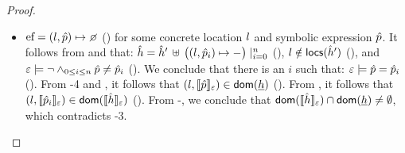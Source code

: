 \begin{proof}
\begin{itemize}
  \item $\efa = (\loc,\sexprp)\pointsto \none$ () for some concrete location $l$ and symbolic expression $\hat{p}$. 
            It follows from  and  that: 
            $\hat{h} = \hat{h}' \, \uplus \, \big((l, \hat{p}_i) \mapsto -\big)\mid_{i = 0}^n$ (), 
            $l \notin {\sf locs}(\hat{h}')$ (), and 
            $\varepsilon \models  \neg\wedge_{0 \leq i \leq n} \hat{p} \neq \hat{p}_i$ (). 
           We conclude that there is an $i$ such that: $\varepsilon \models \hat{p} = \hat{p}_i$ (). 
           From \hyp{4} and , it follows that $(l, \llbracket \hat{p} \rrbracket_{\varepsilon}) \in \mathsf{dom}(\underline{h})$ (). 
           From , it follows that $(l, \llbracket \hat{p}_i \rrbracket_{\varepsilon}) \in \mathsf{dom}(\llbracket \hat{h} \rrbracket_{\varepsilon})$ (). 
           From -, we conclude that $\mathsf{dom}(\llbracket \hat{h} \rrbracket_{\varepsilon}) \cap \mathsf{dom}(\underline{h}) \neq \emptyset$, which contradicts \hyp{3}.
\end{itemize}


\end{proof}



%



